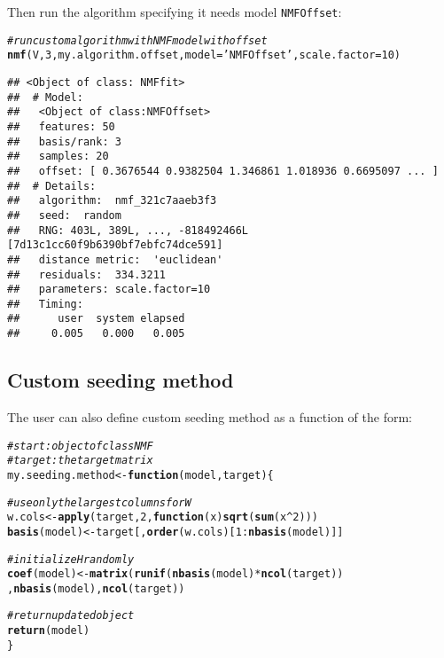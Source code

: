 \documentclass[a4paper]{article}\usepackage[]{graphicx}\usepackage[]{color}
\makeatletter
\newcommand{\hlnum}[1]{\textcolor[rgb]{0.686,0.059,0.569}{#1}}%
\newcommand{\hlstr}[1]{\textcolor[rgb]{0.192,0.494,0.8}{#1}}%
\newcommand{\hlcom}[1]{\textcolor[rgb]{0.678,0.584,0.686}{\textit{#1}}}%
\newcommand{\hlopt}[1]{\textcolor[rgb]{0,0,0}{#1}}%
\newcommand{\hlstd}[1]{\textcolor[rgb]{0.345,0.345,0.345}{#1}}%
\newcommand{\hlkwa}[1]{\textcolor[rgb]{0.161,0.373,0.58}{\textbf{#1}}}%
\newcommand{\hlkwb}[1]{\textcolor[rgb]{0.69,0.353,0.396}{#1}}%
\newcommand{\hlkwc}[1]{\textcolor[rgb]{0.333,0.667,0.333}{#1}}%
\newcommand{\hlkwd}[1]{\textcolor[rgb]{0.737,0.353,0.396}{\textbf{#1}}}%
\newenvironment{kframe}{%
 \def\at@end@of@kframe{}%
 \ifinner\ifhmode%
  \def\at@end@of@kframe{\end{minipage}}%
  \begin{minipage}{\columnwidth}%
 \fi\fi%
 \def\FrameCommand##1{\hskip\@totalleftmargin \hskip-\fboxsep
 \colorbox{shadecolor}{##1}\hskip-\fboxsep
     \hskip-\linewidth \hskip-\@totalleftmargin \hskip\columnwidth}%
 \MakeFramed {\advance\hsize-\width
   \@totalleftmargin\z@ \linewidth\hsize
   \@setminipage}}%
 {\par\unskip\endMakeFramed%
 \at@end@of@kframe}
\newenvironment{knitrout}{}{} %
\let\code=\texttt
\makeatother
\begin{document}
Then run the algorithm specifying it needs model \code{NMFOffset}:
\begin{knitrout}
\color{fgcolor}\begin{kframe}
\begin{alltt}
\hlcom{# run custom algorithm with NMF model with offset}
\hlkwd{nmf}\hlstd{(V,} \hlnum{3}\hlstd{, my.algorithm.offset,} \hlkwc{model}\hlstd{=}\hlstr{'NMFOffset'}\hlstd{,} \hlkwc{scale.factor}\hlstd{=}\hlnum{10}\hlstd{)}
\end{alltt}
\begin{verbatim}
## <Object of class: NMFfit>
##  # Model:
##   <Object of class:NMFOffset>
##   features: 50 
##   basis/rank: 3 
##   samples: 20 
##   offset: [ 0.3676544 0.9382504 1.346861 1.018936 0.6695097 ... ]
##  # Details:
##   algorithm:  nmf_321c7aaeb3f3 
##   seed:  random 
##   RNG: 403L, 389L, ..., -818492466L [7d13c1cc60f9b6390bf7ebfc74dce591]
##   distance metric:  'euclidean' 
##   residuals:  334.3211 
##   parameters: scale.factor=10 
##   Timing:
##      user  system elapsed 
##     0.005   0.000   0.005
\end{verbatim}
\end{kframe}
\end{knitrout}


\subsection{Custom seeding method}\label{sec:seed_custom}

The user can also define custom seeding method as a function of the form:


\begin{knitrout}
\color{fgcolor}\begin{kframe}
\begin{alltt}
\hlcom{# start: object of class NMF}
\hlcom{# target: the target matrix}
\hlstd{my.seeding.method} \hlkwb{<-} \hlkwa{function}\hlstd{(}\hlkwc{model}\hlstd{,} \hlkwc{target}\hlstd{)\{}

        \hlcom{# use only the largest columns for W}
        \hlstd{w.cols} \hlkwb{<-} \hlkwd{apply}\hlstd{(target,} \hlnum{2}\hlstd{,} \hlkwa{function}\hlstd{(}\hlkwc{x}\hlstd{)} \hlkwd{sqrt}\hlstd{(}\hlkwd{sum}\hlstd{(x}\hlopt{^}\hlnum{2}\hlstd{)))}
        \hlkwd{basis}\hlstd{(model)} \hlkwb{<-} \hlstd{target[,}\hlkwd{order}\hlstd{(w.cols)[}\hlnum{1}\hlopt{:}\hlkwd{nbasis}\hlstd{(model)]]}

        \hlcom{# initialize H randomly}
        \hlkwd{coef}\hlstd{(model)} \hlkwb{<-} \hlkwd{matrix}\hlstd{(}\hlkwd{runif}\hlstd{(}\hlkwd{nbasis}\hlstd{(model)}\hlopt{*}\hlkwd{ncol}\hlstd{(target))}
                                                \hlstd{,} \hlkwd{nbasis}\hlstd{(model),} \hlkwd{ncol}\hlstd{(target))}

        \hlcom{# return updated object}
        \hlkwd{return}\hlstd{(model)}
\hlstd{\}}
\end{alltt}
\end{kframe}
\end{knitrout}
\end{document}
